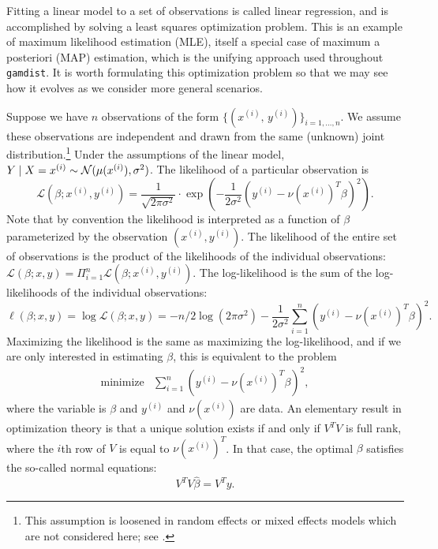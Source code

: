 \documentclass[12pt]{article}
\newcommand{\gamdist}{\texttt{gamdist}}
\begin{document}
Fitting a linear model to a set of observations is called linear regression, and is accomplished by solving a least squares optimization problem. This is an example of maximum likelihood estimation (MLE), itself a special case of maximum a posteriori (MAP) estimation, which is the unifying approach used throughout \gamdist{}. It is worth formulating this optimization problem so that we may see how it evolves as we consider more general scenarios.

Suppose we have $n$ observations of the form $\{ (x^{(i)}, \,y^{(i)} ) \}_{i=1, \ldots, n}$. We assume these observations are independent and drawn from the same (unknown) joint distribution.\footnote{This assumption is loosened in random effects or mixed effects models which are not considered here; see \cite{Stroup:2012}.} Under the assumptions of the linear model, $Y \; | \; X = x^{(i)} \sim {\mathcal N} (\mu(x^{(i)}), \sigma^2)$. The likelihood of a particular observation is
\begin{displaymath}
    \mathcal{L}(\beta; x^{(i)}, y^{(i)}) = \frac{1}{\sqrt{2\pi \sigma^2}} \cdot \exp\left( -\frac{1}{2 \sigma^2} \left(y^{(i)} - \nu \left( x^{(i)} \right)^T \beta \right)^2 \right).
\end{displaymath}
Note that by convention the likelihood is interpreted as a function of $\beta$ parameterized by the observation $(x^{(i)}, y^{(i)})$. The likelihood of the entire set of observations is the product of the likelihoods of the individual observations: $\mathcal{L}(\beta; x, y) = \Pi_{i=1}^n \mathcal{L}(\beta; x^{(i)}, y^{(i)})$. The log-likelihood is the sum of the log-likelihoods of the individual observations:
\begin{displaymath}
   \ell(\beta; x, y) = \log \mathcal{L}(\beta; x, y) = -n/2 \log(2\pi \sigma^2) - \frac{1}{2\sigma^2} \sum_{i=1}^n \left( y^{(i)} - \nu \left(x^{(i)} \right)^T \beta \right)^2.
\end{displaymath}
Maximizing the likelihood is the same as maximizing the log-likelihood, and if we are only interested in estimating $\beta$, this is equivalent to the problem
\begin{displaymath}
        \begin{array}{ll}
            \mbox{minimize} & {\displaystyle \sum_{i=1}^n} \left( y^{(i)} - \nu \left(x^{(i)} \right)^T \beta \right)^2,
        \end{array}
\end{displaymath}
where the variable is $\beta$ and $y^{(i)}$ and $\nu(x^{(i)})$ are data. An elementary result in optimization theory is that a unique solution exists if and only if $V^T V$ is full rank, where the $i$th row of $V$ is equal to $\nu(x^{(i)})^T$. In that case, the optimal $\beta$ satisfies the so-called normal equations:
\begin{displaymath}
    V^T V \hat{\beta} = V^T  y.
\end{displaymath}
\end{document}
